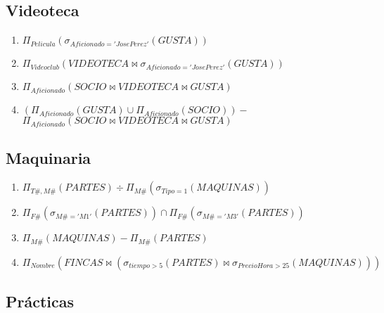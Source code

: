 \documentclass{db-practice}
\begin{document}
\subsection{Videoteca}

\begin{enumerate}
    \item $\Pi_{Pelicula} \left( \sigma_{Aficionado='Jose Perez'} \left( GUSTA \right) \right)$
    \item $\Pi_{Videoclub} \left( VIDEOTECA \bowtie \sigma_{Aficionado='Jose Perez'} \left( GUSTA \right) \right)$
    \item $\Pi_{Aficionado} \left( SOCIO \bowtie VIDEOTECA \bowtie GUSTA \right)$
    \item $\left( \Pi_{Aficionado} \left( GUSTA \right) \cup \Pi_{Aficionado} \left( SOCIO \right) \right) -$ \\
          $\Pi_{Aficionado} \left( SOCIO \bowtie VIDEOTECA \bowtie GUSTA \right)$
\end{enumerate}

\subsection{Maquinaria}

\begin{enumerate}
    \item $\Pi_{T\#,M\#} \left( PARTES \right) \div \Pi_{M\#} \left( \sigma_{Tipo=1} \left( MAQUINAS \right) \right)$
    \item $\Pi_{F\#} \left( \sigma_{M\#='M1'} \left( PARTES \right) \right) \cap \Pi_{F\#} \left( \sigma_{M\#='M3'} \left( PARTES \right) \right)$
    \item $\Pi_{M\#} \left( MAQUINAS \right) - \Pi_{M\#} \left( PARTES \right)$
    \item $\Pi_{Nombre} \left( FINCAS \bowtie \left( \sigma_{tiempo>5} \left( PARTES \right) \bowtie \sigma_{PrecioHora>25} \left( MAQUINAS \right) \right) \right)$
\end{enumerate}

\subsection{Prácticas}
\end{document}
